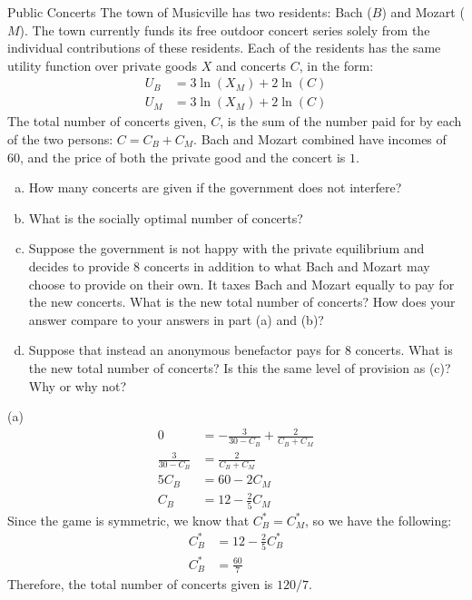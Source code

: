 \documentclass[10pt]{extarticle}
\begin{document}
  \begin{problem}{Public Concerts}
    The town of Musicville has two residents: Bach ($B$) and Mozart ($M$). The town currently funds its free outdoor concert series solely from the individual contributions of these residents. Each of the residents has the same utility function over private goods $X$ and concerts $C$, in the form:
    \begin{align*}
      U_B &= 3\ln(X_M) + 2\ln(C)\\
      U_M &= 3\ln(X_M) + 2\ln(C)
    \end{align*}
    The total number of concerts given, $C$, is the sum of the number paid for by each of the two persons: $C = C_B + C_M$. Bach and Mozart combined have incomes of 60, and the price of both the private good and the concert is $1$.
    \begin{enumerate}[(a)]
      \item How many concerts are given if the government does not interfere?
      \item What is the socially optimal number of concerts?
      \item Suppose the government is not happy with the private equilibrium and decides to provide 8 concerts in addition to what Bach and Mozart may choose to provide on their own. It taxes Bach and Mozart equally to pay for the new concerts. What is the new total number of concerts? How does your answer compare to your answers in part (a) and (b)?
      \item Suppose that instead an anonymous benefactor pays for 8 concerts. What is the new total number of concerts? Is this the same level of provision as (c)? Why or why not?
    \end{enumerate}
    \tcblower
    \begin{problem}{(a)}
      \begin{align*}
        0 &= -\frac{3}{30-C_B} + \frac{2}{C_B + C_M}\\
        \frac{3}{30-C_B} &= \frac{2}{C_B + C_M}\\
        5C_B &= 60-2C_M\\
        C_B &= 12-\frac{2}{5}C_M
      \end{align*}
      Since the game is symmetric, we know that $C_B^* = C_M^*$, so we have the following:
      \begin{align*}
        C_B^* &= 12 - \frac{2}{5}C_B^*\\
        C_B^* &= \frac{60}{7}
      \end{align*}
      Therefore, the total number of concerts given is $120/7$.

\end{problem}
\end{problem}
\end{document}
